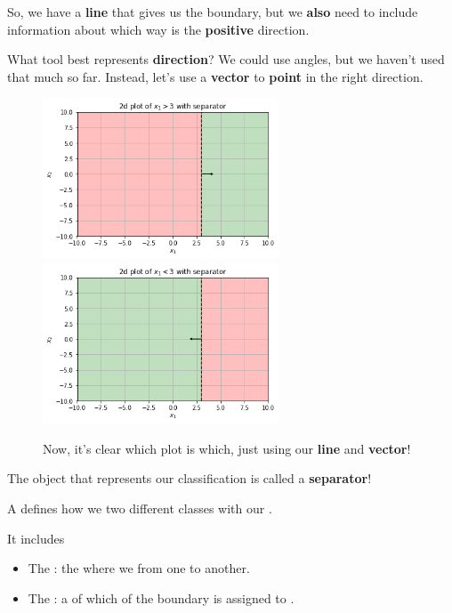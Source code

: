         So, we have a \textbf{line} that gives us the boundary, but we \textbf{also} need to include information about which way is the \textbf{positive} direction.
        
        What tool best represents \textbf{direction}? We could use angles, but we haven't used that much so far. Instead, let's use a \textbf{vector} to \textbf{point} in the right direction.
        
        \begin{figure}[H]
                \includegraphics[width=70mm,scale=0.5]{images/classification_images/x1_2d_plot_separator.png}
                \includegraphics[width=70mm,scale=0.5]{images/classification_images/x1_2d_plot_separator_reversed.png}
                
                \caption*{Now, it's clear which plot is which, just using our \textbf{line} and \textbf{vector}!}
        \end{figure}
        
        The object that represents our classification is called a \textbf{separator}!
            \\
            
        \begin{definition}
            A  defines how we  two different classes with our .
            
            It includes
            
            \begin{itemize}
                \item The : the  where we  from one  to another.
                \item The : a  of which  of the boundary is assigned to .
            \end{itemize}
        \end{definition}
        
